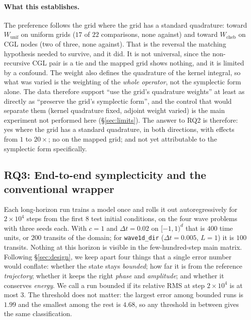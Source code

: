 \documentclass[11pt]{article}
\theoremstyle{definition}
\theoremstyle{remark}
\newcommand{\Wc}{W_{\mathrm{cheb}}}
\newcommand{\Wu}{W_{\mathrm{unif}}}
\begin{document}
\paragraph{What this establishes.} The preference follows the grid where the
grid has a standard quadrature: toward $\Wu$ on uniform grids ($17$ of $22$
comparisons, none against) and toward $\Wc$ on CGL nodes (two of three, none
against). That is the reversal the matching hypothesis needed to survive, and it
did. It is not universal, since the non-recursive CGL pair is a tie and the mapped
grid shows nothing, and it is limited by a confound.
The weight also defines the quadrature of the kernel integral, so what was
varied is the weighting of the \emph{whole operator}, not the symplectic form
alone. The data therefore support ``use the grid's quadrature weights'' at least
as directly as ``preserve the grid's symplectic form'', and the control that would
separate them (kernel quadrature fixed, adjoint weight varied) is the main
experiment not performed here (\S\ref{sec:limits}). The answer to RQ2 is
therefore: yes where the grid has a standard quadrature, in both directions,
with effects from $1$ to $20\times$; no on the mapped grid; and not yet
attributable to the symplectic form specifically.

\subsection{RQ3: End-to-end symplecticity and the conventional wrapper}
\label{sec:long}

Each long-horizon run trains a model once and rolls it out autoregressively for
$2\times10^{4}$ steps from the first $8$ test initial conditions, on the four wave
problems with three seeds each. With $c=1$ and $\Delta t=0.02$ on $[-1,1)^d$
that is $400$ time units, or $200$ transits of the domain; for
\texttt{wave1d\_dir} ($\Delta t=0.005$, $L=1$) it is $100$ transits. Nothing at
this horizon is visible in the few-hundred-step main matrix. Following
\S\ref{sec:design}, we keep apart four things that a single error number would
conflate: whether the state stays \emph{bounded}; how far it is from the
reference \emph{trajectory}; whether it keeps the right \emph{phase} and
\emph{amplitude}; and whether it conserves \emph{energy}. We call a run bounded
if its relative RMS at step $2\times10^{4}$ is at most $3$. The threshold does
not matter: the largest error among bounded runs is $1.99$ and the smallest
among the rest is $4.68$, so any threshold in between gives the same
classification.
\end{document}
